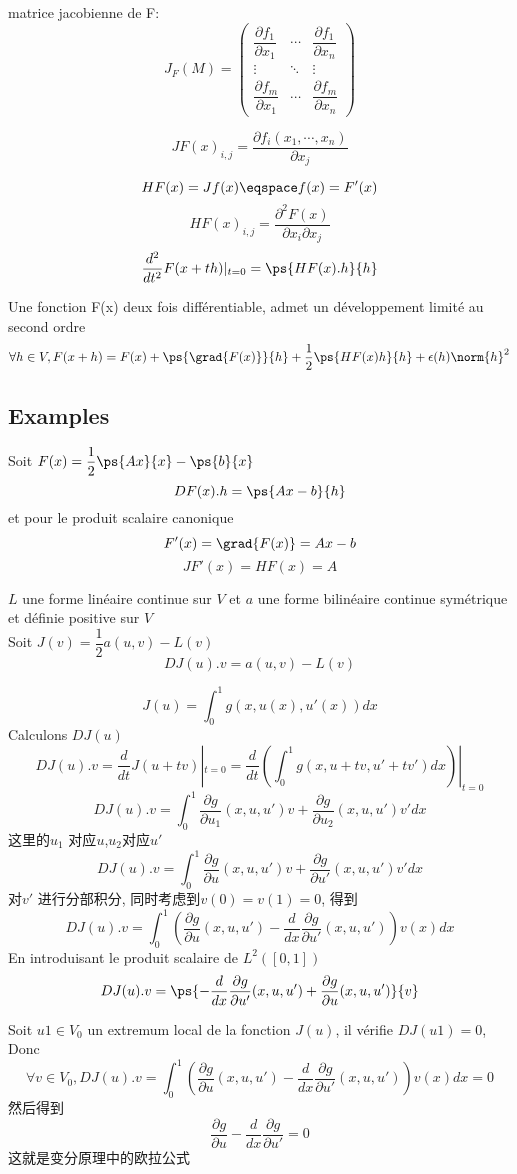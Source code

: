 \documentclass{article}
\begin{document}
matrice jacobienne de F:
$$
J_F\left(M\right)=
\begin{pmatrix} 
\dfrac{\partial f_1}{\partial x_1} & \cdots & \dfrac{\partial f_1}{\partial x_n} \\
\vdots & \ddots & \vdots \\
\dfrac{\partial f_m}{\partial x_1} & \cdots & \dfrac{\partial f_m}{\partial x_n}
\end{pmatrix}
$$

$$
JF(x)_{i,j} = \frac{\partial  f_i(x_1, \cdots, x_n)}{\partial x_j}
$$

$$
HF(x) = Jf(x) \eqspace f(x) = F'(x)
$$
$$
HF(x)_{i,j} = \frac{\partial ^2 F(x)}{\partial x_i \partial  x_j}
$$
$$
\frac{d^2}{d t^2}F(x+th)|_{t=0} = \ps{HF(x).h}{h}
$$

\begin{proposition}
Une fonction F(x) deux fois diff\'erentiable, admet un d\'eveloppement limit\'e au second ordre
$$ \forall h \in V, F(x+h) = F(x) + \ps{\grad{F(x)}}{h} + \frac{1}{2}\ps{HF(x)h}{h} + \epsilon(h)\norm{h}^2 $$
\end{proposition}

\subsection{Examples}
\begin{example}
Soit $F(x) = \dfrac{1}{2}\ps{Ax}{x} - \ps{b}{x}$
$$DF(x).h = \ps{Ax-b}{h}$$
et pour le produit scalaire canonique
$$
F'(x) = \grad{F(x)} = Ax - b
$$
$$JF'(x) = HF(x) = A$$
\end{example}

\begin{example}
$L$ une forme lin\'eaire continue sur $V$  et $a$  une forme bilin\'eaire continue sym\'etrique et d\'efinie positive sur $V$ \\
Soit $J(v) = \dfrac{1}{2}a(u,v) - L(v)$
$$
DJ(u).v = a(u,v) - L(v)
$$
\end{example}

\begin{example}
$$J(u) = \int_0^1 g(x,u(x),u'(x))dx$$
Calculons $DJ(u)$
$$
DJ(u).v 
= \frac{d}{dt}J(u+tv)|_{t=0}
=\frac{d}{dt}(\int_0^1 g(x,u+tv,u'+tv')dx)|_{t=0}
$$
$$
DJ(u).v 
=\int_0^1 \frac{\partial g}{\partial u_1}(x,u,u')v + \frac{\partial g}{\partial u_2}(x,u,u')v' dx
$$
这里的$u_1$ 对应$u$,$u_2$对应$u'$
$$
DJ(u).v 
=\int_0^1 \frac{\partial g}{\partial u}(x,u,u')v + \frac{\partial g}{\partial u'}(x,u,u')v' dx
$$
对$v'$ 进行分部积分, 同时考虑到$v(0)=v(1)=0$, 得到
$$
DJ(u).v 
=\int_0^1 (\frac{\partial g}{\partial u}(x,u,u') - \frac{d}{dx}\frac{\partial g}{\partial u'}(x,u,u'))v(x) dx
$$
En introduisant le produit scalaire de $L^2([0,1])$
$$
DJ(u).v 
= \ps{-\frac{d}{dx}\frac{\partial g}{\partial u'}(x,u,u')+\frac{\partial g}{\partial u}(x,u,u')}{v}
$$

Soit $u1 \in V_0$ un extremum local de la fonction $J(u)$, il v\'erifie $DJ(u1) = 0$, Donc
$$
\forall v \in V_0, DJ(u).v = \int_0^1 (\frac{\partial  g}{\partial u}(x,u,u') - \frac{d}{dx}\frac{\partial g}{\partial u'}(x,u,u'))v(x) dx = 0
$$
然后得到
$$
\frac{\partial g}{\partial u} - \frac{d}{dx}\frac{\partial g}{\partial u'} = 0
$$
这就是变分原理中的欧拉公式
\end{example}
\end{document}
